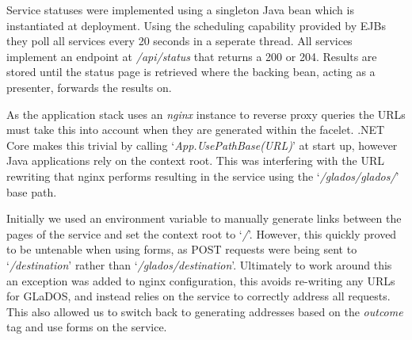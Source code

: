 \par
Service statuses were implemented using a singleton Java bean which is instantiated at deployment. Using the scheduling capability provided by EJBs they poll all services every 20 seconds in a seperate thread. All services implement an endpoint at \textit{/api/status} that returns a 200 or 204. Results are stored until the status page is retrieved where the backing bean, acting as a presenter, forwards the results on.

\par
As the application stack uses an \textit{nginx} instance to reverse proxy queries the URLs must take this into account when they are generated within the facelet. .NET Core makes this trivial by calling `\textit{App.UsePathBase(URL)}' at start up, however Java applications rely on the context root. This was interfering with the URL rewriting that nginx performs resulting in the service using the 
`\textit{/glados/glados/}' base path.

\par
Initially we used an environment variable to manually generate links between the pages of the service and set the context root to 
`\textit{/}'. However, this quickly proved to be untenable when using forms, as POST requests were being sent to 
`\textit{/destination}' 
rather than 
`\textit{/glados/destination}'. Ultimately to work around this an exception was added to nginx configuration, this avoids re-writing any URLs for GLaDOS, and instead relies on the service to correctly address all requests. This also allowed us to switch back to generating addresses based on the \textit{outcome} tag and use forms on the service.
